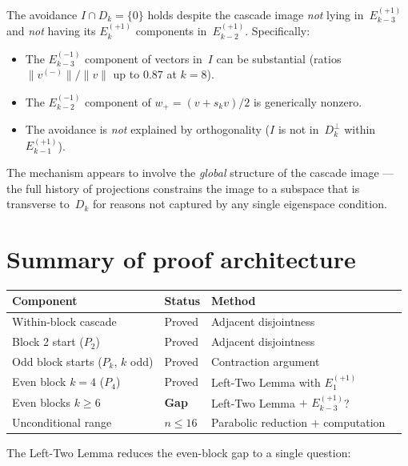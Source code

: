 \documentclass[11pt]{article}
\theoremstyle{definition}
\theoremstyle{remark}
\newcommand{\Eplus}[1]{E_{#1}^{(+1)}}
\newcommand{\Eminus}[1]{E_{#1}^{(-1)}}
\begin{document}
The avoidance $I \cap D_k = \{0\}$ holds despite the cascade image
\emph{not} lying in~$\Eplus{k-3}$ and \emph{not} having its
$\Eplus{k}$ components in~$\Eplus{k-2}$. Specifically:
\begin{itemize}
  \item The $\Eminus{k-3}$ component of vectors in~$I$ can be
    substantial (ratios $\|v^{(-)}\|/\|v\|$ up to $0.87$ at $k=8$).
  \item The $\Eminus{k-2}$ component of $w_+ = (v + s_k v)/2$ is
    generically nonzero.
  \item The avoidance is \emph{not} explained by orthogonality ($I$ is
    not in~$D_k^\perp$ within~$\Eplus{k-1}$).
\end{itemize}

The mechanism appears to involve the \emph{global} structure of the
cascade image --- the full history of projections constrains the
image to a subspace that is transverse to~$D_k$ for reasons not
captured by any single eigenspace condition.

\section{Summary of proof architecture}\label{sec:summary}

\begin{center}
\begin{tabular}{llll}
\toprule
\textbf{Component} & \textbf{Status} & \textbf{Method} \\
\midrule
Within-block cascade & Proved & Adjacent disjointness \\
Block 2 start ($P_2$) & Proved & Adjacent disjointness \\
Odd block starts ($P_k$, $k$ odd) & Proved & Contraction argument \\
Even block $k = 4$ ($P_4$) & Proved & Left-Two Lemma with $\Eplus{1}$ \\
Even blocks $k \ge 6$ & \textbf{Gap} & Left-Two Lemma $+$ $\Eplus{k-3}$? \\
\midrule
Unconditional range & $n \le 16$ & Parabolic reduction $+$ computation \\
\bottomrule
\end{tabular}
\end{center}

\noindent The Left-Two Lemma reduces the even-block gap to a single
question:
\end{document}
